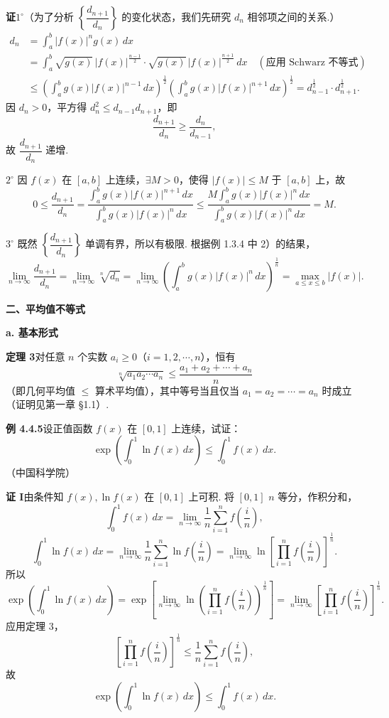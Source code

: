 \documentclass[UTF8, 12pt, fontset=fandol, oneside]{ctexart}
\begin{document}
\noindent\textbf{证}\quad $1^\circ$（为了分析 $\left\{\dfrac{d_{n+1}}{d_n}\right\}$ 的变化状态，我们先研究 $d_n$ 相邻项之间的关系.）
\[
\begin{aligned}
d_n&=\int_a^b |f(x)|^n g(x)\,dx\\
&=\int_a^b \sqrt{g(x)}\,|f(x)|^{\frac{n-1}{2}}\cdot
\sqrt{g(x)}\,|f(x)|^{\frac{n+1}{2}}\,dx\quad(\text{应用 Schwarz 不等式})\\
&\le\left(\int_a^b g(x)|f(x)|^{n-1}\,dx\right)^{\frac12}
\left(\int_a^b g(x)|f(x)|^{n+1}\,dx\right)^{\frac12}
=d_{n-1}^{\frac12}\cdot d_{n+1}^{\frac12}.
\end{aligned}
\]
因 $d_n>0$，平方得 $d_n^2\le d_{n-1}d_{n+1}$，即
\[
\frac{d_{n+1}}{d_n}\ge\frac{d_n}{d_{n-1}},
\]
故 $\dfrac{d_{n+1}}{d_n}$ 递增.

$2^\circ$ 因 $f(x)$ 在 $[a,b]$ 上连续，$\exists M>0$，使得 $|f(x)|\le M$ 于 $[a,b]$ 上，故
\[
0\le\frac{d_{n+1}}{d_n}
=\frac{\int_a^b g(x)|f(x)|^{n+1}\,dx}{\int_a^b g(x)|f(x)|^n\,dx}
\le \frac{M\int_a^b g(x)|f(x)|^n\,dx}{\int_a^b g(x)|f(x)|^n\,dx}=M.
\]

$3^\circ$ 既然 $\left\{\dfrac{d_{n+1}}{d_n}\right\}$ 单调有界，所以有极限. 根据例 1.3.4 中 2）的结果，
\[
\lim_{n\to\infty}\frac{d_{n+1}}{d_n}
=\lim_{n\to\infty}\sqrt[n]{d_n}
=\lim_{n\to\infty}\left(\int_a^b g(x)|f(x)|^n\,dx\right)^{\frac1n}
=\max_{a\le x\le b}|f(x)|.
\]

\noindent\textbf{二、平均值不等式}

\noindent\textbf{a. 基本形式}

\noindent\textbf{定理 3}\quad 对任意 $n$ 个实数 $a_i\ge0$（$i=1,2,\cdots,n$），恒有
\[
\sqrt[n]{a_1a_2\cdots a_n}\le \frac{a_1+a_2+\cdots+a_n}{n} \tag{1}
\]
（即几何平均值 $\le$ 算术平均值），其中等号当且仅当 $a_1=a_2=\cdots=a_n$ 时成立（证明见第一章 §1.1）.

\noindent\textbf{例 4.4.5}\quad 设正值函数 $f(x)$ 在 $[0,1]$ 上连续，试证：
\[
\exp\left(\int_0^1\ln f(x)\,dx\right)\le\int_0^1 f(x)\,dx.
\]
（中国科学院）

\noindent\textbf{证 I}\quad 由条件知 $f(x),\ln f(x)$ 在 $[0,1]$ 上可积. 将 $[0,1]$ $n$ 等分，作积分和，
\[
\int_0^1 f(x)\,dx=\lim_{n\to\infty}\frac1n\sum_{i=1}^n f\left(\frac in\right),
\]
\[
\int_0^1\ln f(x)\,dx
=\lim_{n\to\infty}\frac1n\sum_{i=1}^n\ln f\left(\frac in\right)
=\lim_{n\to\infty}\ln\left[\prod_{i=1}^n f\left(\frac in\right)\right]^{\frac1n}.
\]
所以
\[
\exp\left(\int_0^1\ln f(x)\,dx\right)
=\exp\left[\lim_{n\to\infty}\ln\left(\prod_{i=1}^n f\left(\frac in\right)\right)^{\frac1n}\right]
=\lim_{n\to\infty}\left[\prod_{i=1}^n f\left(\frac in\right)\right]^{\frac1n}.
\]
应用定理 3，
\[
\left[\prod_{i=1}^n f\left(\frac in\right)\right]^{\frac1n}
\le\frac1n\sum_{i=1}^n f\left(\frac in\right),
\]
故
\[
\exp\left(\int_0^1\ln f(x)\,dx\right)\le\int_0^1 f(x)\,dx.
\]
\end{document}
